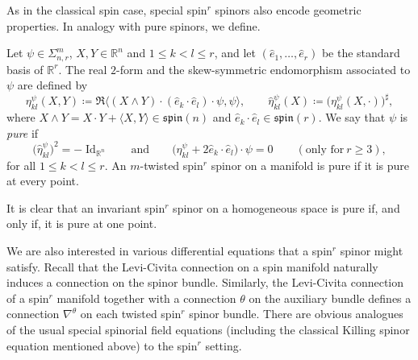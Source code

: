 \documentclass[pdftex]{sigma}
\numberwithin{equation}{section}
\DeclareMathOperator{\Id}{Id}
\begin{document}
As in the classical spin case, special spin$^r$ spinors also encode geometric properties. In analogy with pure spinors, we define.

		\begin{Definition}[\cite{ES19}]
			Let $\psi \in \Sigma_{n,r}^m$, $X,Y \in \mathbb{R}^n$ and $1 \leq k<l \leq r$, and let $(\hat{e}_1, \dots, \hat{e}_r)$ be the standard basis of $\mathbb{R}^r$. The real $2$-form  and the skew-symmetric endomorphism  associated to $\psi$ are defined by
			\[
			\eta_{kl}^{\psi} (X,Y) \coloneqq \Re \langle (X \wedge Y ) \cdot (\hat{e}_k \cdot \hat{e}_l) \cdot \psi , \psi \rangle , \qquad
			\hat{\eta}_{kl}^{\psi} (X) \coloneqq \bigl( \eta_{kl}^{\psi} (X, \cdot) \bigr)^{\sharp} ,
			\]
			where $X \wedge Y = X \cdot Y + \langle X,Y \rangle \in \mathfrak{spin}(n)$ and $\hat{e}_k \cdot \hat{e}_l \in \mathfrak{spin}(r)$. We say that $\psi$ is \textit{pure} if
			\[ \bigl( \hat{\eta}_{kl}^{\psi} \bigr)^2 = -\Id_{\mathbb{R}^n} \qquad \text{and} \qquad \bigl( \eta_{kl}^{\psi} + 2 \hat{e}_k \cdot \hat{e}_l \bigr) \cdot \psi = 0 \qquad (\text{only for}\ r \geq 3) ,
			\]
			for all $1 \leq k < l \leq r$. An $m$-twisted spin$^r$ spinor on a manifold is pure if it is pure at every point.
		\end{Definition}
		
		It is clear that an invariant spin$^r$ spinor on a homogeneous space is pure if, and only if, it is pure at one point.
		
		We are also interested in various differential equations that a spin$^r$ spinor might satisfy. Recall that the Levi-Civita connection on a spin manifold naturally induces a connection on the spinor bundle. Similarly, the Levi-Civita connection of a spin$^r$ manifold together with a connection $\theta$ on the auxiliary bundle defines a connection $\nabla^{\theta}$ on each twisted spin$^r$ spinor bundle. There are obvious analogues of the usual special spinorial field equations (including the classical Killing spinor equation mentioned above) to the spin$^r$ setting.
\end{document}
